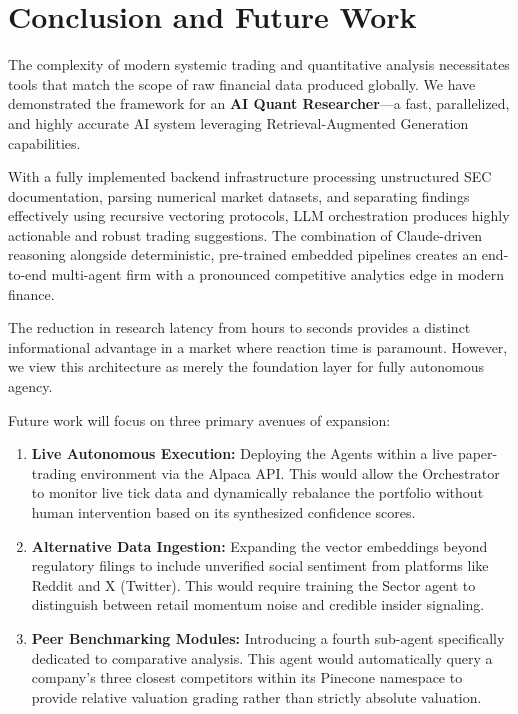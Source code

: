 \section{Conclusion and Future Work}

The complexity of modern systemic trading and quantitative analysis necessitates tools that match the scope of raw financial data produced globally. We have demonstrated the framework for an \textbf{AI Quant Researcher}---a fast, parallelized, and highly accurate AI system leveraging Retrieval-Augmented Generation capabilities.

With a fully implemented backend infrastructure processing unstructured SEC documentation, parsing numerical market datasets, and separating findings effectively using recursive vectoring protocols, LLM orchestration produces highly actionable and robust trading suggestions. The combination of Claude-driven reasoning alongside deterministic, pre-trained embedded pipelines creates an end-to-end multi-agent firm with a pronounced competitive analytics edge in modern finance.

The reduction in research latency from hours to seconds provides a distinct informational advantage in a market where reaction time is paramount. However, we view this architecture as merely the foundation layer for fully autonomous agency.

Future work will focus on three primary avenues of expansion:
\begin{enumerate}
    \item \textbf{Live Autonomous Execution:} Deploying the Agents within a live paper-trading environment via the Alpaca API. This would allow the Orchestrator to monitor live tick data and dynamically rebalance the portfolio without human intervention based on its synthesized confidence scores.
    \item \textbf{Alternative Data Ingestion:} Expanding the vector embeddings beyond regulatory filings to include unverified social sentiment from platforms like Reddit and X (Twitter). This would require training the Sector agent to distinguish between retail momentum noise and credible insider signaling.
    \item \textbf{Peer Benchmarking Modules:} Introducing a fourth sub-agent specifically dedicated to comparative analysis. This agent would automatically query a company's three closest competitors within its Pinecone namespace to provide relative valuation grading rather than strictly absolute valuation.
\end{enumerate}
